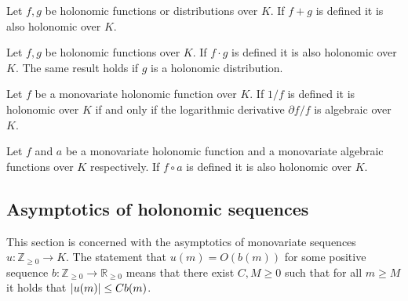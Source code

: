     \begin{theorem}{\cite[Proposition 3.1]{zeilberger1990holonomic}}
      Let $f,g$ be holonomic functions or distributions over $K$.
      If $f+g$ is defined it is also holonomic over $K$.
    \end{theorem}
    \begin{theorem}{\cite[Proposition 3.2]{zeilberger1990holonomic}}
      Let $f,g$ be holonomic functions over $K$.
      If $f\cdot g$ is defined it is also holonomic over $K$.
      The same result holds if $g$ is a holonomic distribution.
    \end{theorem}
    \begin{theorem}{\cite[Corollary 1]{harris1985reciprocals}}
      Let $f$ be a monovariate holonomic function over $K$.
      If $1/f$ is defined it is holonomic over $K$ if and only if the logarithmic derivative $\partial f/f$ is algebraic over $K$.
    \end{theorem}
    \begin{theorem}{\cite[Theorem 2.7]{stanley1980differentiably}}\label{thm: AlgebraicPrecomp}
      Let $f$ and $a$ be a monovariate holonomic function and a monovariate algebraic functions over $K$ respectively.
      If $f\circ a$ is defined it is also holonomic over $K$.
    \end{theorem}
    \subsection{Asymptotics of holonomic sequences}\label{subsec: Asymptotic}
    This section is concerned with the asymptotics of monovariate sequences $u:\mathbb{Z}_{\geq 0}\to K$.
    The statement that $u(m) = O(b(m))$ for some positive sequence $b:\mathbb{Z}_{\geq 0}\to \mathbb{R}_{\geq 0}$ means that there exist $C,M\geq 0$ such that for all $m\geq M$ it holds that $\vert u(m) \vert\leq Cb(m)$.

